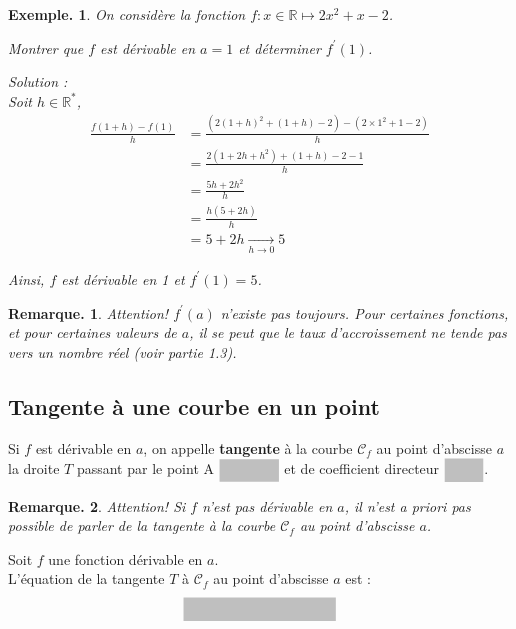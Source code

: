 \documentclass[12pt]{article}
\theoremstyle{break}
\newtheorem*{example}{Exemple.}
\newtheorem*{remark}{Remarque.}
\begin{document}
\begin{example}
On considère la fonction $f: x \in \mathbb{R} \longmapsto 2 x^{2}+x-2$.

Montrer que $f$ est dérivable en $a=1$ et déterminer $f^{\prime}(1)$.

\newpage
Solution :\\
Soit $h \in \mathbb{R}^{*}$,
$$
\begin{aligned}
\frac{f(1+h)-f(1)}{h} & =\frac{\left(2(1+h)^{2}+(1+h)-2\right)-\left(2 \times 1^{2}+1-2\right)}{h} \\
& =\frac{2\left(1+2 h+h^{2}\right)+(1+h)-2-1}{h} \\
& =\frac{5 h+2 h^{2}}{h} \\
& =\frac{h(5+2 h)}{h} \\
& =5+2 h \underset{h \rightarrow 0}{\longrightarrow} 5
\end{aligned}
$$

Ainsi, $f$ est dérivable en 1 et $f^{\prime}(1)=5$.
\end{example}

\begin{remark}
Attention! $f^{\prime}(a)$ n'existe pas toujours. Pour certaines fonctions, et pour certaines valeurs de $a$, il se peut que le taux d'accroissement ne tende pas vers un nombre réel (voir partie 1.3).
\end{remark}

\subsection{Tangente à une courbe en un point}
\begin{definition}{}{}
Si $f$ est dérivable en $a$, on appelle \textbf{tangente} à la courbe $\mathcal{C}_{f}$ au point d'abscisse $a$ la droite $T$ passant par le point A $\hideM{(a ; f(a))}$ et de coefficient directeur $\hideM{f^{\prime}(a)}$.
\end{definition}

\begin{remark}
Attention! Si $f$ n'est pas dérivable en $a$, il n'est \textit{a priori} pas possible de parler de la tangente à la courbe $\mathcal{C}_{f}$ au point d'abscisse $a$.
\end{remark}

\begin{proposition}{}{}
Soit $f$ une fonction dérivable en $a$.\\
L'équation de la tangente $T$ à $\mathcal{C}_{f}$ au point d'abscisse $a$ est :
$$
\hideM{y=f^{\prime}(a)(x-a)+f(a)}
$$
\end{proposition}
\end{document}
